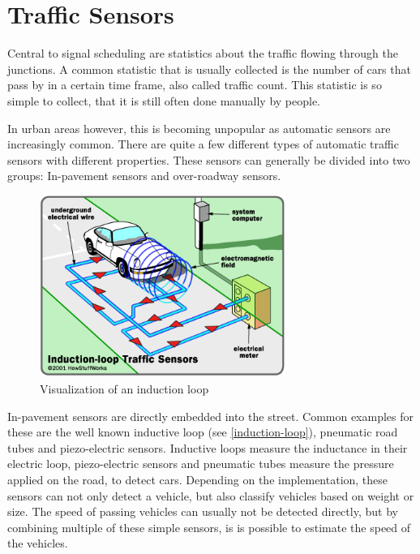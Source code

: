 \section{Traffic Sensors}
\label{trafficSensors}

Central to signal scheduling are statistics about the traffic flowing through the junctions. A common statistic that is usually collected is the number of cars that pass by in a certain time frame, also called traffic count. This statistic is so simple to collect, that it is still often done manually by people.

In urban areas however, this is becoming unpopular as automatic sensors are increasingly common. There are quite a few different types of automatic traffic sensors with different properties. These sensors can generally be divided into two groups: In-pavement sensors and over-roadway sensors. \cite{tmg}

\begin{figure}[ht]
	\centering
	\includegraphics[width=8cm]{figures/induction-loop}
	\caption{Visualization of an induction loop}
	\label{induction-loop}
\end{figure}

In-pavement sensors are directly embedded into the street. Common examples for these are the well known inductive loop (see \autoref{induction-loop}), pneumatic road tubes and piezo-electric sensors. Inductive loops measure the inductance in their electric loop, piezo-electric sensors and pneumatic tubes measure the pressure applied on the road, to detect cars. Depending on the implementation, these sensors can not only detect a vehicle, but also classify vehicles based on weight or size. The speed of passing vehicles can usually not be detected directly, but by combining multiple of these simple sensors, is is possible to estimate the speed of the vehicles.

